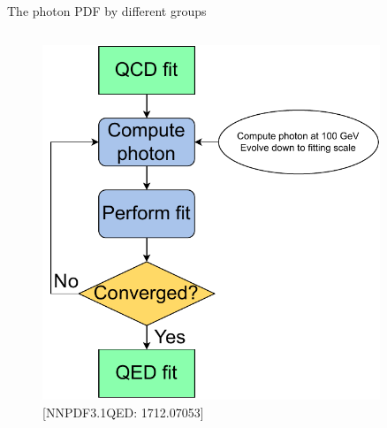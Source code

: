 \documentclass[aspectratio=169, 8pt,t]{beamer}
\begin{document}
\begin{frame}{The photon PDF by different groups}
\begin{columns}[T]
    \begin{column}{0.39\textwidth}
      \vspace*{-1.5em}
      \begin{figure}
        \includegraphics[width=0.9\textwidth]{figures/luxqed_iteration.pdf}
        \caption*{\color{gray}\small [NNPDF3.1QED: 1712.07053]}
      \end{figure}
    \end{column}
  \end{columns}

\end{frame}
\end{document}
